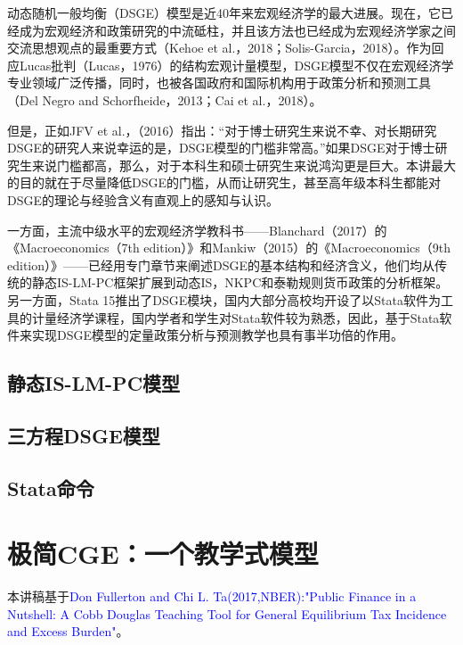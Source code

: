 \documentclass[cn,12pt,math=newtx,citestyle=gb7714-2015,bibstyle=gb7714-2015]{elegantbook}
\begin{document}
	动态随机一般均衡（DSGE）模型是近40年来宏观经济学的最大进展。现在，它已经成为宏观经济和政策研究的中流砥柱，并且该方法也已经成为宏观经济学家之间交流思想观点的最重要方式（Kehoe et al.，2018；Solis-Garcia，2018）。作为回应Lucas批判（Lucas，1976）的结构宏观计量模型，DSGE模型不仅在宏观经济学专业领域广泛传播，同时，也被各国政府和国际机构用于政策分析和预测工具（Del Negro and Schorfheide，2013；Cai et al.，2018）。
	
	但是，正如JFV et al.，（2016）指出：“对于博士研究生来说不幸、对长期研究DSGE的研究人来说幸运的是，DSGE模型的门槛非常高。”如果DSGE对于博士研究生来说门槛都高，那么，对于本科生和硕士研究生来说鸿沟更是巨大。本讲最大的目的就在于尽量降低DSGE的门槛，从而让研究生，甚至高年级本科生都能对DSGE的理论与经验含义有直观上的感知与认识。
	
	一方面，主流中级水平的宏观经济学教科书——Blanchard（2017）的《Macroeconomics（7th edition）》和Mankiw（2015）的《Macroeconomics（9th edition）》——已经用专门章节来阐述DSGE的基本结构和经济含义，他们均从传统的静态IS-LM-PC框架扩展到动态IS，NKPC和泰勒规则货币政策的分析框架。另一方面，Stata 15推出了DSGE模块，国内大部分高校均开设了以Stata软件为工具的计量经济学课程，国内学者和学生对Stata软件较为熟悉，因此，基于Stata软件来实现DSGE模型的定量政策分析与预测教学也具有事半功倍的作用。
	
	\section{静态IS-LM-PC模型}
	
	
	\section{三方程DSGE模型}
	
	
	\section{Stata命令}
	
	
	
	\chapter{极简CGE：一个教学式模型}
	
	
	
		本讲稿基于\textcolor{blue}{Don Fullerton and Chi L. Ta(2017,NBER):"Public Finance in a Nutshell: A Cobb Douglas Teaching Tool for General Equilibrium Tax Incidence and Excess Burden"}。
	
	
	
\end{document}
